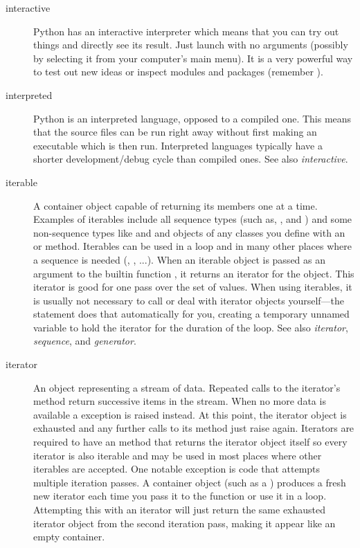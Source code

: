 \begin{description}
\item[interactive]
Python has an interactive interpreter which means that you can try out
things and directly see its result.  Just launch  with no
arguments (possibly by selecting it from your computer's main menu).
It is a very powerful way to test out new ideas or inspect modules and
packages (remember ).

\item[interpreted]
Python is an interpreted language, opposed to a compiled one.  This
means that the source files can be run right away without first making
an executable which is then run.  Interpreted languages typically have
a shorter development/debug cycle than compiled ones.  See also
{}\emph{interactive}.

\item[iterable]
A container object capable of returning its members one at a time.
Examples of iterables include all sequence types (such as,
{}, and ) and some non-sequence types like
{} and  and objects of any classes you define
with an  or  method.  Iterables
can be used in a  loop and in many other places where a
sequence is needed (, , ...).  When an
iterable object is passed as an argument to the builtin function
{}, it returns an iterator for the object.  This
iterator is good for one pass over the set of values.  When using
iterables, it is usually not necessary to call  or
deal with iterator objects yourself---the  statement does
that automatically for you, creating a temporary unnamed variable to
hold the iterator for the duration of the loop.  See also
{}\emph{iterator}, \emph{sequence}, and \emph{generator}.

\item[iterator]
An object representing a stream of data.  Repeated calls to the
iterator's  method return successive items in the
stream.  When no more data is available a 
exception is raised instead.  At this point, the iterator object is
exhausted and any further calls to its  method just
raise  again.  Iterators are required to have
an  method that returns the iterator object
itself so every iterator is also iterable and may be used in most
places where other iterables are accepted.  One notable exception is
code that attempts multiple iteration passes.  A container object
(such as a ) produces a fresh new iterator each time you
pass it to the  function or use it in a
{} loop.  Attempting this with an iterator will just
return the same exhausted iterator object from the second iteration
pass, making it appear like an empty container.


\end{description}
